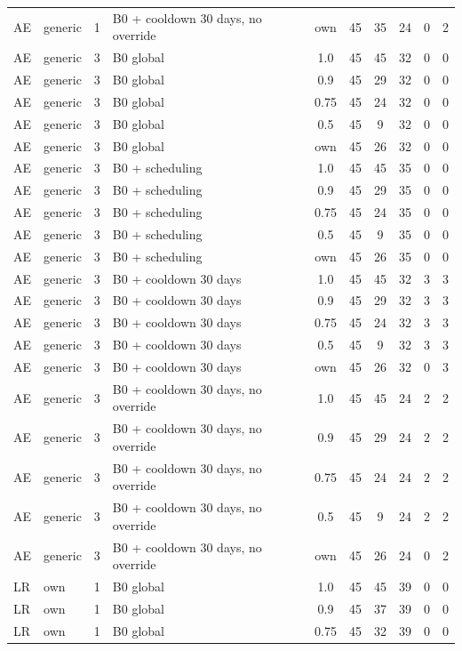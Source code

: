\documentclass[10pt,onecolumn,letterpaper]{article}
\begin{document}
\begin{longtable}{lllp{4.4cm}cccccc}
AE & generic & 1 & B0 + cooldown 30 days, no override & own & 45 & 35 & 24 & 0 & 2 \\
AE & generic & 3 & B0 global & 1.0 & 45 & 45 & 32 & 0 & 0 \\
AE & generic & 3 & B0 global & 0.9 & 45 & 29 & 32 & 0 & 0 \\
AE & generic & 3 & B0 global & 0.75 & 45 & 24 & 32 & 0 & 0 \\
AE & generic & 3 & B0 global & 0.5 & 45 & 9 & 32 & 0 & 0 \\
AE & generic & 3 & B0 global & own & 45 & 26 & 32 & 0 & 0 \\
AE & generic & 3 & B0 + scheduling & 1.0 & 45 & 45 & 35 & 0 & 0 \\
AE & generic & 3 & B0 + scheduling & 0.9 & 45 & 29 & 35 & 0 & 0 \\
AE & generic & 3 & B0 + scheduling & 0.75 & 45 & 24 & 35 & 0 & 0 \\
AE & generic & 3 & B0 + scheduling & 0.5 & 45 & 9 & 35 & 0 & 0 \\
AE & generic & 3 & B0 + scheduling & own & 45 & 26 & 35 & 0 & 0 \\
AE & generic & 3 & B0 + cooldown 30 days & 1.0 & 45 & 45 & 32 & 3 & 3 \\
AE & generic & 3 & B0 + cooldown 30 days & 0.9 & 45 & 29 & 32 & 3 & 3 \\
AE & generic & 3 & B0 + cooldown 30 days & 0.75 & 45 & 24 & 32 & 3 & 3 \\
AE & generic & 3 & B0 + cooldown 30 days & 0.5 & 45 & 9 & 32 & 3 & 3 \\
AE & generic & 3 & B0 + cooldown 30 days & own & 45 & 26 & 32 & 0 & 3 \\
AE & generic & 3 & B0 + cooldown 30 days, no override & 1.0 & 45 & 45 & 24 & 2 & 2 \\
AE & generic & 3 & B0 + cooldown 30 days, no override & 0.9 & 45 & 29 & 24 & 2 & 2 \\
AE & generic & 3 & B0 + cooldown 30 days, no override & 0.75 & 45 & 24 & 24 & 2 & 2 \\
AE & generic & 3 & B0 + cooldown 30 days, no override & 0.5 & 45 & 9 & 24 & 2 & 2 \\
AE & generic & 3 & B0 + cooldown 30 days, no override & own & 45 & 26 & 24 & 0 & 2 \\
LR & own & 1 & B0 global & 1.0 & 45 & 45 & 39 & 0 & 0 \\
LR & own & 1 & B0 global & 0.9 & 45 & 37 & 39 & 0 & 0 \\
LR & own & 1 & B0 global & 0.75 & 45 & 32 & 39 & 0 & 0 \\

\end{longtable}
\end{document}
